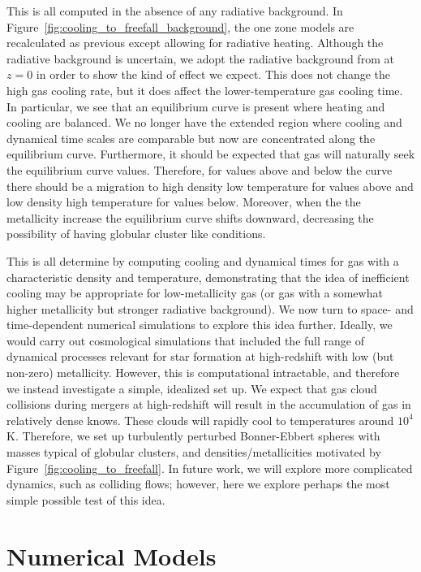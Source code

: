 \documentclass[useAMS,usenatbib]{mn2e}
\begin{document}
This is all computed in the absence of any radiative background.  In Figure~\ref{fig:cooling_to_freefall_background}, 
the one zone models are recalculated as previous except allowing for radiative heating.   Although the radiative background
is uncertain, we adopt the radiative background from \citet{Haardt2012} at $z=$0 
in order to show the kind of effect we expect.  This does not change the high gas cooling rate, but it does affect the lower-temperature gas cooling time.   In particular, we see that an equilibrium curve is present where
heating and cooling are balanced. We no longer have the extended region where cooling and dynamical time scales are 
comparable but now are concentrated along the equilibrium curve. Furthermore, it should be expected that gas will
naturally seek the equilibrium curve values. Therefore, for values above and below the curve there should be a migration
to high density low temperature for values above and low density high temperature for values below.  Moreover, when the
the metallicity increase the equilibrium curve shifts downward, decreasing the possibility of having globular cluster
like conditions.

This is all determine by computing cooling and dynamical times for gas with a characteristic density and temperature, demonstrating that the idea of inefficient cooling may be appropriate for low-metallicity gas (or gas with a somewhat higher metallicity but stronger radiative background).   We now turn to space- and time-dependent numerical simulations to explore this idea further.  Ideally, we would carry out cosmological simulations that included the full range of dynamical processes relevant for star formation at high-redshift with low (but non-zero) metallicity.  However, this is computational intractable, and therefore we instead investigate a simple, idealized set up.  We expect that gas cloud collisions during mergers at high-redshift will result in the accumulation of gas in relatively dense knows.  These clouds will rapidly cool to temperatures around $10^4$ K.  Therefore, we set up turbulently perturbed Bonner-Ebbert spheres with masses typical of globular clusters, and densities/metallicities motivated by Figure~\ref{fig:cooling_to_freefall}.   In future work, we will explore more complicated dynamics, such as colliding flows; however, here we explore perhaps the most simple possible test of this idea.



%
\section{Numerical Models}
\label{sec:numerical}
\end{document}
